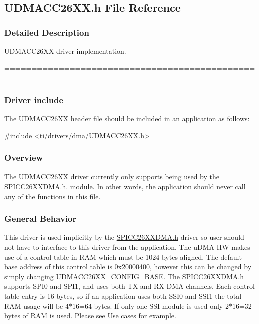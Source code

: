 \subsection{U\+D\+M\+A\+C\+C26\+X\+X.\+h File Reference}
\label{_u_d_m_a_c_c26_x_x_8h}


\subsubsection{Detailed Description}
U\+D\+M\+A\+C\+C26\+X\+X driver implementation. 

============================================================================

\subsubsection*{Driver include}

The U\+D\+M\+A\+C\+C26\+X\+X header file should be included in an application as follows\+: 
\begin{DoxyCode}
\textcolor{preprocessor}{#include <ti/drivers/dma/UDMACC26XX.h>}
\end{DoxyCode}


\subsubsection*{Overview}

The U\+D\+M\+A\+C\+C26\+X\+X driver currently only supports being used by the \hyperlink{_s_p_i_c_c26_x_x_d_m_a_8h}{S\+P\+I\+C\+C26\+X\+X\+D\+M\+A.\+h}. module. In other words, the application should never call any of the functions in this file.

\subsubsection*{General Behavior}

This driver is used implicitly by the \hyperlink{_s_p_i_c_c26_x_x_d_m_a_8h}{S\+P\+I\+C\+C26\+X\+X\+D\+M\+A.\+h} driver so user should not have to interface to this driver from the application. The u\+D\+M\+A H\+W makes use of a control table in R\+A\+M which must be 1024 bytes aligned. The default base address of this control table is 0x20000400, however this can be changed by simply changing U\+D\+M\+A\+C\+C26\+X\+X\+\_\+\+C\+O\+N\+F\+I\+G\+\_\+\+B\+A\+S\+E. The \hyperlink{_s_p_i_c_c26_x_x_d_m_a_8h}{S\+P\+I\+C\+C26\+X\+X\+D\+M\+A.\+h} supports S\+P\+I0 and S\+P\+I1, and uses both T\+X and R\+X D\+M\+A channels. Each control table entry is 16 bytes, so if an application uses both S\+S\+I0 and S\+S\+I1 the total R\+A\+M usage will be 4$\ast$16=64 bytes. If only one S\+S\+I module is used only 2$\ast$16=32 bytes of R\+A\+M is used. Please see \hyperlink{_u_d_m_a_c_c26_x_x_8h_USE_CASE}{Use cases} for example.

